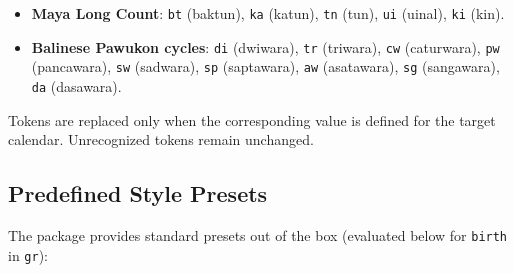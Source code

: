 \documentclass[10pt]{article}
\begin{document}
\begin{itemize}
    \item \textbf{Maya Long Count}:
          \texttt{bt} (baktun),
          \texttt{ka} (katun),
          \texttt{tn} (tun),
          \texttt{ui} (uinal),
          \texttt{ki} (kin).

    \item \textbf{Balinese Pawukon cycles}:
          \texttt{di} (dwiwara),
          \texttt{tr} (triwara),
          \texttt{cw} (caturwara),
          \texttt{pw} (pancawara),
          \texttt{sw} (sadwara),
          \texttt{sp} (saptawara),
          \texttt{aw} (asatawara),
          \texttt{sg} (sangawara),
          \texttt{da} (dasawara).

\end{itemize}




Tokens are replaced only when the corresponding value is defined for the
target calendar. Unrecognized tokens remain unchanged.

\subsection{Predefined Style Presets}
The package provides standard presets out of the box (evaluated below for \texttt{birth} in \texttt{gr}):
\end{document}
